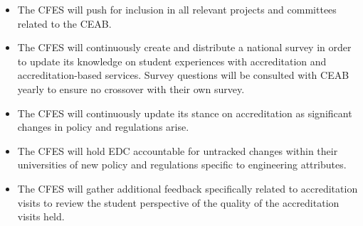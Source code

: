 \begin{itemize}
 \item The CFES will push for inclusion in all relevant projects and committees related to the CEAB.
 \item The CFES will continuously create and distribute a national survey in order to update its knowledge on student experiences with accreditation and accreditation-based services. Survey questions will be consulted with CEAB yearly to ensure no crossover with their own survey.
 \item The CFES will continuously update its stance on accreditation as significant changes in policy and regulations arise.
 \item The CFES will hold EDC accountable for untracked changes within their universities of new policy and regulations specific to engineering attributes.
 \item The CFES will gather additional feedback specifically related to accreditation visits to review the student perspective of the quality of the accreditation visits held.
\end{itemize}

\newpage
